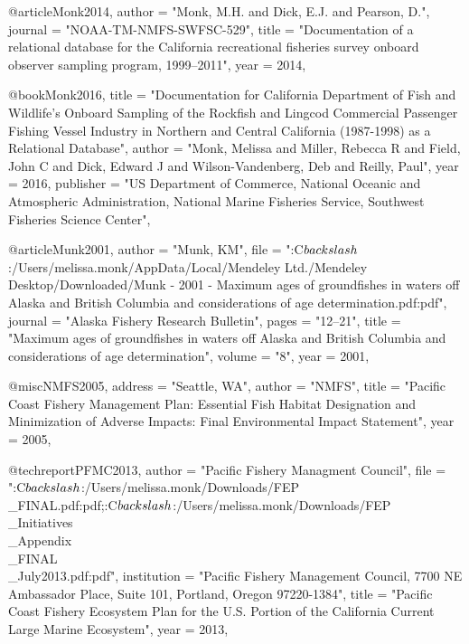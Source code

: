 @article{Monk2014,
    author = "{Monk, M.H. and Dick, E.J. and Pearson, D.}",
    journal = "{NOAA-TM-NMFS-SWFSC-529}",
    title = "{{Documentation of a relational database for the California recreational fisheries survey onboard observer sampling program, 1999--2011}}",
    year = 2014,
}

@book{Monk2016,
    title = "{Documentation for California Department of Fish and Wildlife's Onboard Sampling of the Rockfish and Lingcod Commercial Passenger Fishing Vessel Industry in Northern and Central California (1987-1998) as a Relational Database}",
    author = "{Monk, Melissa and Miller, Rebecca R and Field, John C and Dick, Edward J and Wilson-Vandenberg, Deb and Reilly, Paul}",
    year = 2016,
    publisher = "{US Department of Commerce, National Oceanic and Atmospheric Administration, National Marine Fisheries Service, Southwest Fisheries Science Center}",
}

@article{Munk2001,
    author = "{Munk, KM}",
    file = "{:C$\\backslash$:/Users/melissa.monk/AppData/Local/Mendeley Ltd./Mendeley Desktop/Downloaded/Munk - 2001 - Maximum ages of groundfishes in waters off Alaska and British Columbia and considerations of age determination.pdf:pdf}",
    journal = "{Alaska Fishery Research Bulletin}",
    pages = "{12--21}",
    title = "{{Maximum ages of groundfishes in waters off Alaska and British Columbia and considerations of age determination}}",
    volume = "{8}",
    year = 2001,
}

@misc{NMFS2005,
    address = "{Seattle, WA}",
    author = "{NMFS}",
    title = "{{Pacific Coast Fishery Management Plan: Essential Fish Habitat Designation and Minimization of Adverse Impacts: Final Environmental Impact Statement}}",
    year = 2005,
}

@techreport{PFMC2013,
    author = "{{Pacific Fishery Managment Council}}",
    file = "{:C$\\backslash$:/Users/melissa.monk/Downloads/FEP\\_FINAL.pdf:pdf;:C$\\backslash$:/Users/melissa.monk/Downloads/FEP\\_Initiatives\\_Appendix\\_FINAL\\_July2013.pdf:pdf}",
    institution = "{Pacific Fishery Management Council, 7700 NE Ambassador Place, Suite 101, Portland, Oregon 97220-1384}",
    title = "{{Pacific Coast Fishery Ecosystem Plan for the U.S. Portion of the California Current Large Marine Ecosystem}}",
    year = 2013,
}

